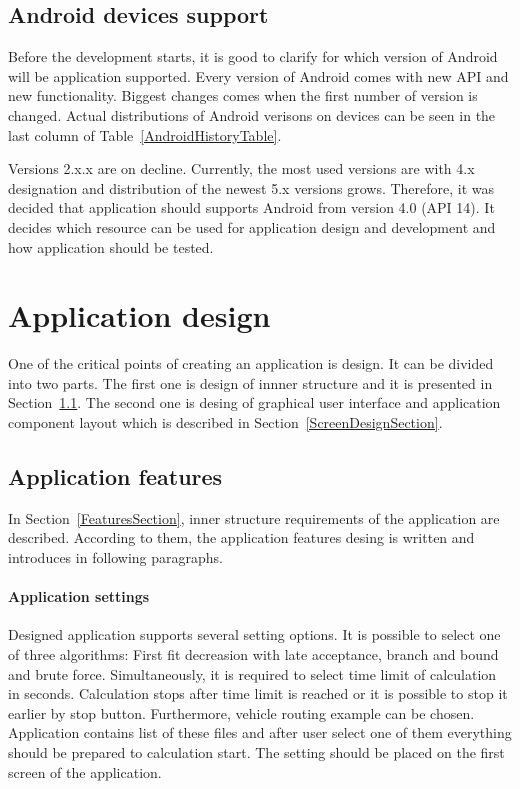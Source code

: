 \subsection{Android devices support}
Before the development starts, it is good to clarify for which version of Android will be application supported. Every
version of Android comes with new API and new functionality. Biggest changes comes when the first number of version is
changed. Actual distributions of Android verisons on devices can be seen in the last column of
Table~\ref{AndroidHistoryTable}.

Versions 2.x.x are on decline. Currently, the most used versions are with 4.x designation and distribution of the newest
5.x versions grows. Therefore, it was decided that application should supports Android from version 4.0 (API 14). It
decides which resource can be used for application design and development and how application should be tested.

\section{Application design}\label{ApplicationDesignSection}
One of the critical points of creating an application is design. It can be divided into two parts. The first one is
design of innner structure and it is presented in Section~\ref{ApplicationFeatureSection}. The second one is desing of
graphical user interface and application component layout which is described in Section~\ref{ScreenDesignSection}.

\subsection{Application features}\label{ApplicationFeatureSection}
In Section~\ref{FeaturesSection}, inner structure requirements of the application are described. According to them, the
application features desing is written and introduces in following paragraphs.

\paragraph{Application settings}
Designed application supports several setting options. It is possible to select one of three algorithms: First fit
decreasion with late acceptance, branch and bound and brute force. Simultaneously, it is required to select time limit
of calculation in seconds. Calculation stops after time limit is reached or it is possible to stop it earlier by stop
button. Furthermore, vehicle routing example can be chosen. Application contains list of these files and after user
select one of them everything should be prepared to calculation start. The setting should be placed on the first screen
of the application.

